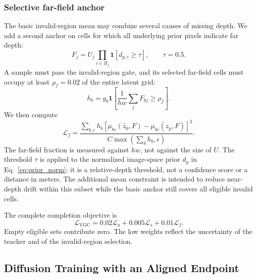 \documentclass[10pt,journal,a4paper]{IEEEtran}
\begin{document}
\subsubsection{Selective far-field anchor}
The basic invalid-region mean may combine several causes of missing depth. We add a second anchor on cells for which all underlying prior pixels indicate far depth:
\begin{equation}
	F_j=U_j\prod_{i\in B_j}\mathbf1[d_{p,i}\geq\tau],\qquad\tau=0.5.
	\label{eq:far_mask}
\end{equation}
A sample must pass the invalid-region gate, and its selected far-field cells must occupy at least $\rho_f=0.02$ of the entire latent grid:
\begin{equation}
	h_b=g_b\mathbf1\!\left[\frac{1}{hw}\sum_j F_{bj}\geq\rho_f\right].
\end{equation}
We then compute
\begin{equation}
	\mathcal L_f=
	\frac{\sum_{b,c}h_b[\mu_{bc}(\hat z_0,F)-\mu_{bc}(z_p,F)]^2}
	{C\max(\sum_b h_b,\epsilon)}.
	\label{eq:far_anchor}
\end{equation}
The far-field fraction is measured against $hw$, not against the size of $U$. The threshold $\tau$ is applied to the normalized image-space prior $d_p$ in Eq.~\eqref{eq:prior_norm}; it is a relative-depth threshold, not a confidence score or a distance in meters. The additional mean constraint is intended to reduce near-depth drift within this subset while the basic anchor still covers all eligible invalid cells.

The complete completion objective is
\begin{equation}
	\mathcal L_{\mathrm{VGC}}=0.02\mathcal L_a+0.005\mathcal L_s+0.01\mathcal L_f.
	\label{eq:vgc}
\end{equation}
Empty eligible sets contribute zero. The low weights reflect the uncertainty of the teacher and of the invalid-region selection.

\subsection{Diffusion Training with an Aligned Endpoint}
\label{sec:diffusion}
\end{document}

